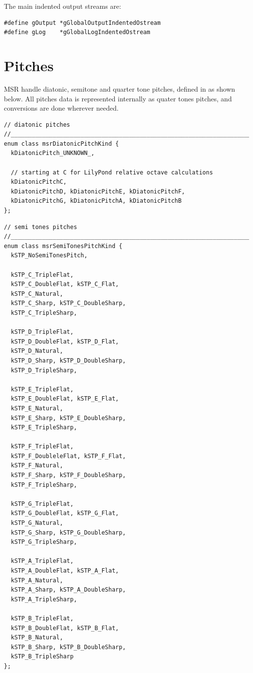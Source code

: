The main indented output streams are:
\begin{lstlisting}[language=CPlusPlus]
#define gOutput *gGlobalOutputIndentedOstream
#define gLog    *gGlobalLogIndentedOstream

\end{lstlisting}


\section{Pitches}\label{Pitches}

MSR handle diatonic, semitone and quarter tone pitches, defined in  as shown below.
All pitches data is represented internally as quater tones pitches, and conversions are done wherever needed.

\begin{lstlisting}[language=CPlusPlus]
// diatonic pitches
//______________________________________________________________________________
enum class msrDiatonicPitchKind {
  kDiatonicPitch_UNKNOWN_,

  // starting at C for LilyPond relative octave calculations
  kDiatonicPitchC,
  kDiatonicPitchD, kDiatonicPitchE, kDiatonicPitchF,
  kDiatonicPitchG, kDiatonicPitchA, kDiatonicPitchB
};
\end{lstlisting}

\begin{lstlisting}[language=CPlusPlus]
// semi tones pitches
//______________________________________________________________________________
enum class msrSemiTonesPitchKind {
  kSTP_NoSemiTonesPitch,

  kSTP_C_TripleFlat,
  kSTP_C_DoubleFlat, kSTP_C_Flat,
  kSTP_C_Natural,
  kSTP_C_Sharp, kSTP_C_DoubleSharp,
  kSTP_C_TripleSharp,

  kSTP_D_TripleFlat,
  kSTP_D_DoubleFlat, kSTP_D_Flat,
  kSTP_D_Natural,
  kSTP_D_Sharp, kSTP_D_DoubleSharp,
  kSTP_D_TripleSharp,

  kSTP_E_TripleFlat,
  kSTP_E_DoubleFlat, kSTP_E_Flat,
  kSTP_E_Natural,
  kSTP_E_Sharp, kSTP_E_DoubleSharp,
  kSTP_E_TripleSharp,

  kSTP_F_TripleFlat,
  kSTP_F_DoubleleFlat, kSTP_F_Flat,
  kSTP_F_Natural,
  kSTP_F_Sharp, kSTP_F_DoubleSharp,
  kSTP_F_TripleSharp,

  kSTP_G_TripleFlat,
  kSTP_G_DoubleFlat, kSTP_G_Flat,
  kSTP_G_Natural,
  kSTP_G_Sharp, kSTP_G_DoubleSharp,
  kSTP_G_TripleSharp,

  kSTP_A_TripleFlat,
  kSTP_A_DoubleFlat, kSTP_A_Flat,
  kSTP_A_Natural,
  kSTP_A_Sharp, kSTP_A_DoubleSharp,
  kSTP_A_TripleSharp,

  kSTP_B_TripleFlat,
  kSTP_B_DoubleFlat, kSTP_B_Flat,
  kSTP_B_Natural,
  kSTP_B_Sharp, kSTP_B_DoubleSharp,
  kSTP_B_TripleSharp
};
\end{lstlisting}

